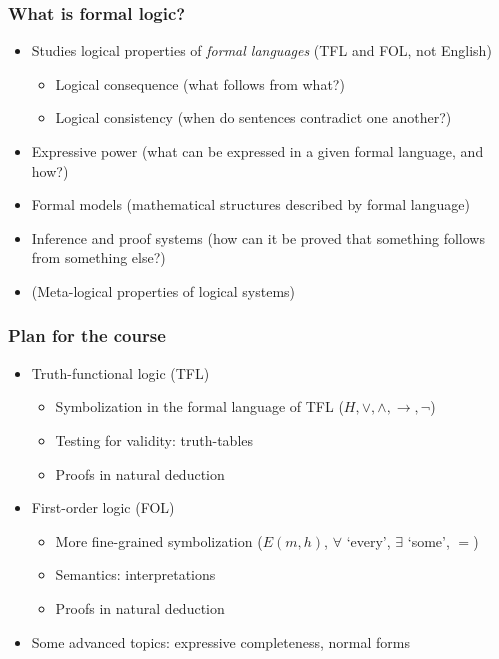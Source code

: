 \begin{frame}
  \frametitle{What is formal logic?}

  \begin{itemize}[<+->]
  \item Studies logical properties of \emph{formal languages} (TFL and
  FOL, not English)
    \begin{itemize}[<+->]
    \item Logical consequence (what follows from what?)
    \item Logical consistency (when do sentences contradict one another?)
    \end{itemize}
  \item Expressive power (what can be expressed in a given formal
  language, and how?)
  \item Formal models (mathematical structures described by formal language)
  \item Inference and proof systems (how can it be proved that something
  follows from something else?)
  \item (Meta-logical properties of logical systems)
  \end{itemize}
\end{frame}

\begin{frame}
  \frametitle{Plan for the course}

  \begin{itemize}[<+->]
  \item Truth-functional logic (TFL)
    \begin{itemize}[<+->]
    \item Symbolization in the formal language of TFL ($H, \lor,
    \land, \to, \lnot$)
    \item Testing for validity: truth-tables
    \item Proofs in natural deduction
    \end{itemize}
  \item First-order logic (FOL)
    \begin{itemize}[<+->]
    \item More fine-grained symbolization ($E(m,h)$, $\forall$
    `every', $\exists$ `some', $=$)
    \item Semantics: interpretations
    \item Proofs in natural deduction
    \end{itemize}
  \item Some advanced topics: expressive completeness, normal forms
  \end{itemize}
\end{frame}

